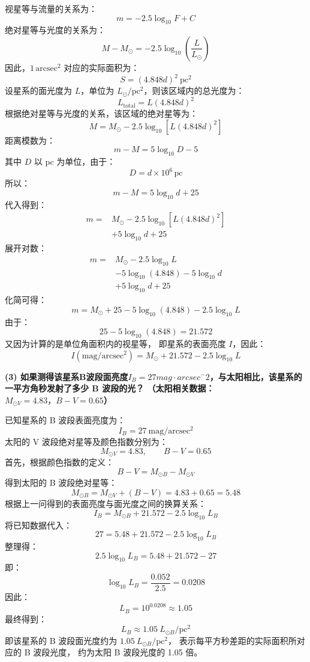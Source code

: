 \documentclass{ctexart}
\begin{document}
\vspace{0.25em}
\noindent 视星等与流量的关系为：
\[m = - 2.5 \log_{10} F + C\]
绝对星等与光度的关系为：
\[M - M_\odot = - 2.5 \log_{10} (\frac{L}{L_\odot})\]
因此，$1\,\mathrm{arcsec}^2$ 对应的实际面积为：
\[S = (4.848 d)^2\ \mathrm{pc}^2\]
设星系的面光度为 $L$，单位为
$L_\odot/\mathrm{pc}^2$，则该区域内的总光度为：
\[
L_{\mathrm{total}}=L(4.848d)^2
\]
根据绝对星等与光度的关系，该区域的绝对星等为：
\[
M=M_\odot-2.5\log_{10}
\left[L(4.848d)^2\right]
\]
距离模数为：
\[
m-M=5\log_{10}D-5
\]
其中 $D$ 以 $\mathrm{pc}$ 为单位，由于：
\[
D=d\times10^6\,\mathrm{pc}
\]
所以：
\[
m-M=5\log_{10}d+25
\]
代入得到：
\[
\begin{aligned}
m={}&M_\odot-2.5\log_{10}
\left[L(4.848d)^2\right]\\
&+5\log_{10}d+25
\end{aligned}
\]
展开对数：
\[
\begin{aligned}
m={}&M_\odot-2.5\log_{10}L\\
&-5\log_{10}(4.848)
-5\log_{10}d\\
&+5\log_{10}d+25
\end{aligned}
\]
化简可得：
\[
m=M_\odot+25-5\log_{10}(4.848)
-2.5\log_{10}L
\]
由于：
\[
25-5\log_{10}(4.848)=21.572
\]
又因为计算的是单位角面积内的视星等，
即星系的表面亮度 $I$，因此：
\[I(\mathrm{mag/arcsec^2})
=M_\odot+21.572-2.5\log_{10}L\]
\vspace{0.5em}

\noindent\textbf{(3) 如果测得该星系B波段面亮度\(I_B = 27 mag \cdot arcsec^-2\)，与太阳相比，该星系的一平方角秒发射了多少 B 波段的光？  （太阳相关数据：\(M_{⊙V} = 4.83，B-V=0.65\)）}

\vspace{0.25em}
\noindent 已知星系的 B 波段表面亮度为：
\[
I_B=27\ \mathrm{mag/arcsec^2}
\]
太阳的 V 波段绝对星等及颜色指数分别为：
\[
M_{\odot V}=4.83,\qquad B-V=0.65
\]
首先，根据颜色指数的定义：
\[
B-V=M_{\odot B}-M_{\odot V}
\]
得到太阳的 B 波段绝对星等：
\[
M_{\odot B}=M_{\odot V}+(B-V)
=4.83+0.65=5.48
\]
根据上一问得到的表面亮度与面光度之间的换算关系：
\[
I_B=M_{\odot B}+21.572
-2.5\log_{10}L_B
\]
将已知数据代入：
\[
27=5.48+21.572-2.5\log_{10}L_B
\]
整理得：
\[
2.5\log_{10}L_B=5.48+21.572-27
\]
即：
\[
\log_{10}L_B=\frac{0.052}{2.5}=0.0208
\]
因此：
\[
L_B=10^{0.0208}\approx1.05
\]
最终得到：
\[
L_B\approx1.05\ L_{\odot B}/\mathrm{pc}^2
\]
即该星系的 B 波段面光度约为
$1.05\ L_{\odot B}/\mathrm{pc}^2$，
表示每平方秒差距的实际面积所对应的 B 波段光度，
约为太阳 B 波段光度的 1.05 倍。
\end{document}
